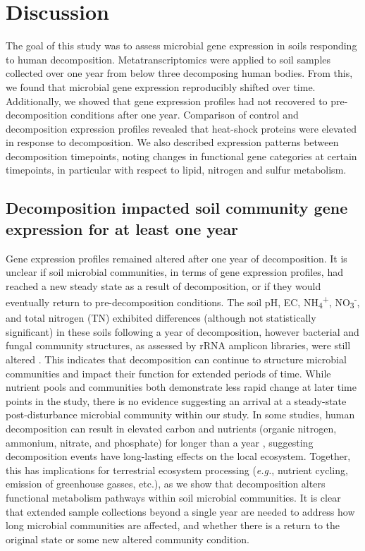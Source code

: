 \documentclass[
  sn-nature,
  lineno, referee]{sn-jnl}
\begin{document}
\section{Discussion}\label{discussion}

The goal of this study was to assess microbial gene expression in soils
responding to human decomposition. Metatranscriptomics were applied to
soil samples collected over one year from below three decomposing human
bodies. From this, we found that microbial gene expression reproducibly
shifted over time. Additionally, we showed that gene expression profiles
had not recovered to pre-decomposition conditions after one year.
Comparison of control and decomposition expression profiles revealed
that heat-shock proteins were elevated in response to decomposition. We
also described expression patterns between decomposition timepoints,
noting changes in functional gene categories at certain timepoints, in
particular with respect to lipid, nitrogen and sulfur metabolism.

\subsection{Decomposition impacted soil community gene expression for at
least one
year}\label{decomposition-impacted-soil-community-gene-expression-for-at-least-one-year}

Gene expression profiles remained altered after one year of
decomposition. It is unclear if soil microbial communities, in terms of
gene expression profiles, had reached a new steady state as a result of
decomposition, or if they would eventually return to pre-decomposition
conditions. The soil pH, EC, NH\textsubscript{4}\textsuperscript{+},
NO\textsubscript{3}\textsuperscript{-}, and total nitrogen (TN)
exhibited differences (although not statistically significant) in these
soils following a year of decomposition, however bacterial and fungal
community structures, as assessed by rRNA amplicon libraries, were still
altered \citep{taylor_transient_2024}. This indicates that decomposition
can continue to structure microbial communities and impact their
function for extended periods of time. While nutrient pools and
communities both demonstrate less rapid change at later time points in
the study, there is no evidence suggesting an arrival at a steady-state
post-disturbance microbial community within our study. In some studies,
human decomposition can result in elevated carbon and nutrients (organic
nitrogen, ammonium, nitrate, and phosphate) for longer than a year
\citep{debruyn_carrion_2024}, suggesting decomposition events have
long-lasting effects on the local ecosystem. Together, this has
implications for terrestrial ecosystem processing (\emph{e.g.}, nutrient
cycling, emission of greenhouse gasses, etc.), as we show that
decomposition alters functional metabolism pathways within soil
microbial communities. It is clear that extended sample collections
beyond a single year are needed to address how long microbial
communities are affected, and whether there is a return to the original
state or some new altered community condition.
\end{document}
